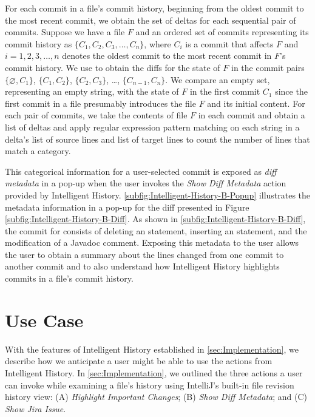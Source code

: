 For each commit in a file's commit history, beginning from the oldest commit to the most recent commit, we obtain the set of deltas for each sequential pair of commits.
Suppose we have a file $F$ and an ordered set of commits representing its commit history as $\{C_{1}, C_{2}, C_{3}, \dots, C_{n}\}$, where $C_{i}$ is a commit that affects $F$ and $i = 1, 2, 3, \dots, n$ denotes the oldest commit to the most recent commit in $F$'s commit history.
We use  to obtain the diffs for the state of $F$ in the commit pairs $\{\varnothing, C_{1}\}$, $\{C_{1}, C_{2}\}$, $\{C_{2}, C_{3}\}$, \dots, $\{C_{n-1}, C_{n}\}$.
We compare an empty set, representing an empty string, with the state of $F$ in the first commit $C_{1}$ since the first commit in a file presumably introduces the file $F$ and its initial content.
For each pair of commits, we take the contents of file $F$ in each commit and  obtain a list of deltas and apply regular expression pattern matching on each string in a delta's list of source lines and list of target lines to count the number of lines that match a category.

This categorical information for a user-selected commit is exposed as \emph{diff metadata} in a pop-up when the user invokes the \textit{Show Diff Metadata} action provided by Intelligent History.
\autoref{subfig:Intelligent-History-B-Popup} illustrates the metadata information in a pop-up for the diff presented in Figure \autoref{subfig:Intelligent-History-B-Diff}.
As shown in \autoref{subfig:Intelligent-History-B-Diff}, the commit  for  consists of deleting an  statement, inserting an  statement, and the modification of a Javadoc comment.
Exposing this metadata to the user allows the user to obtain a summary about the lines changed from one commit to another commit and to also understand how Intelligent History highlights commits in a file's commit history.

\section{Use Case}
\label{sec:Use-Case}

With the features of Intelligent History established in \autoref{sec:Implementation}, we describe how we anticipate a user might be able to use the actions from Intelligent History. 
In \autoref{sec:Implementation}, we outlined the three actions a user can invoke while examining a file's history using IntelliJ's built-in file revision history view: (A) \textit{Highlight Important Changes}; (B) \textit{Show Diff Metadata}; and (C) \textit{Show Jira Issue}.

